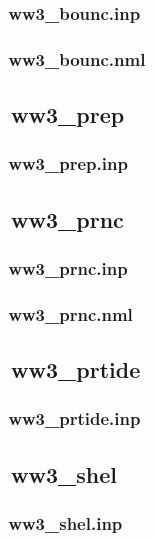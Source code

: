 \subsubsection{~ww3\_bounc.inp} \label{sec:config041}
\vsssub
\vsssub
\subsubsection{~ww3\_bounc.nml} \label{sec:config042}
\vsssub
\vssub


\vssub
\subsection{~ww3\_prep}
\vsssub
\subsubsection{~ww3\_prep.inp} \label{sec:config051}
\vsssub
\vssub


\vssub
\subsection{~ww3\_prnc}
\vsssub
\subsubsection{~ww3\_prnc.inp} \label{sec:config061}
\vsssub
\vsssub
\subsubsection{~ww3\_prnc.nml} \label{sec:config062}
\vsssub
\vssub


\vssub
\subsection{~ww3\_prtide}
\vsssub
\subsubsection{~ww3\_prtide.inp} \label{sec:config071}
\vsssub
\vssub


\vssub
\subsection{~ww3\_shel}
\vsssub
\subsubsection{~ww3\_shel.inp} \label{sec:config081}
\vsssub
\vsssub
